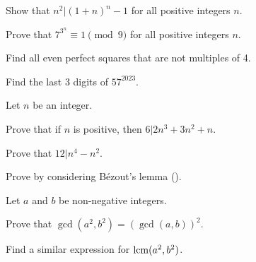 \begin{problem}
    Show that $n^2 \vert (1+n)^n - 1$ for all positive integers $n$.
\end{problem}

\begin{problem}
    Prove that $7^{3^n} \equiv 1 \pmod 9$ for all positive integers $n$.
\end{problem}

\begin{problem}
    Find all even perfect squares that are not multiples of 4.
\end{problem}

\begin{problem}
    Find the last 3 digits of $57^{2023}$.
\end{problem}

\begin{problem}
    Let $n$ be an integer.
    \begin{partquestions}{\roman*}
        \item Prove that if $n$ is positive, then $6 \vert 2n^3 + 3n^2 + n$.
        \item Prove that $12 \vert n^4 - n^2$.
    \end{partquestions}
\end{problem}

\begin{problem}\label{problem-n-divides-ab-and-n-coprime-with-a-implies-n-divides-b}
    Prove  by considering B\'ezout's lemma ().
\end{problem}

\begin{problem}
    Let $a$ and $b$ be non-negative integers.
    \begin{partquestions}{\roman*}
        \item Prove that $\gcd(a^2, b^2) = \left(\gcd(a,b)\right)^2$.
        \item Find a similar expression for $\mathrm{lcm}(a^2, b^2)$.
    \end{partquestions}
\end{problem}
